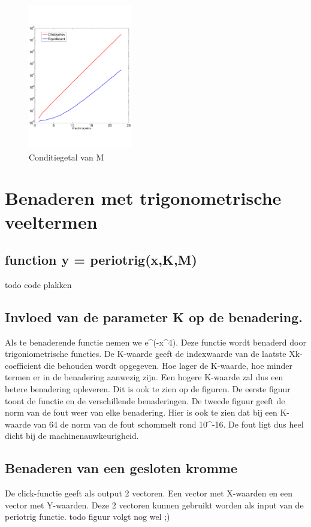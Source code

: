 \documentclass[a4paper, 12pt, titlepage]{report}
\begin{document}
 \begin{center}
 \begin{figure}[!hb]
 \centering
  	\includegraphics[width=0.4\textwidth]{condition.pdf}
  	\caption{Conditiegetal van M}
  	\label{condition}
  \end{figure}
 \end{center}
 
\section{Benaderen met trigonometrische veeltermen}
\subsection{function y = periotrig(x,K,M)}
todo code plakken
\subsection{Invloed van de parameter K op de benadering.}
Als te benaderende functie nemen we e^(-x^4). Deze functie wordt benaderd door trigoniometrische functies. De K-waarde geeft de indexwaarde van de laatste Xk-coefficient die behouden wordt opgegeven. Hoe lager de K-waarde, hoe minder termen er in de benadering aanwezig zijn. Een hogere K-waarde zal dus een betere benadering opleveren. Dit is ook te zien op de figuren. De eerste figuur toont de functie en de verschillende benaderingen. De tweede figuur geeft de norm van de fout weer van elke benadering. Hier is ook te zien dat bij een K-waarde van 64 de norm van de fout schommelt rond 10^-16. De fout ligt dus heel dicht bij de machinenauwkeurigheid.

\subsection{Benaderen van een gesloten kromme}
De click-functie geeft als output 2 vectoren. Een vector met X-waarden en een vector met Y-waarden. Deze 2 vectoren kunnen gebruikt worden als input van de periotrig functie.
todo figuur volgt nog wel ;)

 
 
\end{document}
